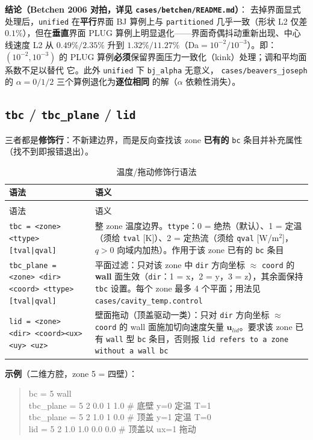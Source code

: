 \textbf{结论（Betchen 2006 对拍，详见 \texttt{cases/betchen/README.md}）}：
去掉界面显式处理后，\texttt{unified} 在\textbf{平行}界面 BJ 算例上与
\texttt{partitioned} 几乎一致（形状 L2 仅差 $0.1\%$），但在\textbf{垂直}界面
PLUG 算例上明显退化——界面奇偶抖动重新出现、中心线速度 L2 从 $0.49\%/2.35\%$
升到 $1.32\%/11.27\%$（Da$=10^{-2}/10^{-3}$）。即：$(10^{-2},10^{-3})$ 的
PLUG 算例\textbf{必须}保留界面压力一致化（kink）处理；调和平均面系数不足以替代
它。此外 \texttt{unified} 下 \texttt{bj\_alpha} 无意义，
\texttt{cases/beavers\_joseph} 的 $\alpha=0/1/2$ 三个算例退化为\textbf{逐位相同}
的解（$\alpha$ 依赖性消失）。

\subsection{\texttt{tbc} / \texttt{tbc\_plane} / \texttt{lid}}\label{app:tbc}

三者都是{\bfseries 修饰行}：不新建边界，而是反向查找该 zone \textbf{已有的}
\texttt{bc} 条目并补充属性（找不到即报错退出）。

{\small
\begin{longtable}{@{}>{\raggedright\arraybackslash}p{}>{\raggedright\arraybackslash}p{}@{}}
\caption{温度/拖动修饰行语法}\label{tab:tbc-keys}\\
\toprule
语法 & 语义 \\
\midrule
\endfirsthead
\multicolumn{2}{@{}l}{\small\itshape 表~\ref{tab:tbc-keys}（续）}\\
\toprule
语法 & 语义 \\
\midrule
\endhead
\bottomrule
\endlastfoot
\texttt{tbc = <zone> <ttype> [tval|qval]} & 整 zone 温度边界。\texttt{ttype}：0 = 绝热（默认）、1 = 定温（须给 \texttt{tval} [K]）、2 = 定热流（须给 \texttt{qval} [W/m$^2$]，$q>0$ 向域内加热）。作用于该 zone 已有的 \texttt{bc} 条目 \\
\texttt{tbc\_plane = <zone> <dir>}\newline \texttt{<coord> <ttype> [tval|qval]} & 平面过滤：只对该 zone 中 \texttt{dir} 方向坐标 $\approx$ \texttt{coord} 的 \textbf{wall} 面生效（\texttt{dir}：1 = x，2 = y，3 = z），其余面保持 \texttt{tbc} 设置。每个 zone 最多 4 个平面；用法见 \texttt{cases/cavity\_temp.control} \\
\texttt{lid = <zone> <dir> <coord>}\newline \texttt{<ux> <uy> <uz>} & 壁面拖动（顶盖驱动一类）：只对 \texttt{dir} 方向坐标 $\approx$ \texttt{coord} 的 wall 面施加切向速度矢量 $\mathbf{u}_{lid}$。要求该 zone 已有 \texttt{wall} 型 \texttt{bc} 条目，否则报 \texttt{lid refers to a zone without a wall bc} \\
\bottomrule
\end{longtable}
}

\noindent\textbf{示例}（二维方腔，zone 5 = 四壁）：

\begin{quote}\ttfamily\small
bc = 5 wall \\
tbc\_plane = 5 2 0.0 1 1.0 \# 底壁 y=0 定温 T=1 \\
tbc\_plane = 5 2 1.0 1 0.0 \# 顶盖 y=1 定温 T=0 \\
lid = 5 2 1.0 1.0 0.0 0.0 \# 顶盖以 ux=1 拖动
\end{quote}
